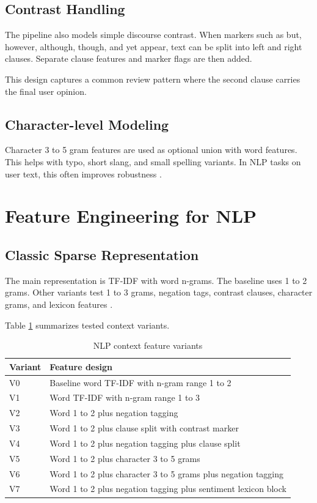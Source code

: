 \documentclass[12pt,a4paper]{article}
\begin{document}
\subsection{Contrast Handling}
The pipeline also models simple discourse contrast. When markers such as but, however, although, though, and yet appear, text can be split into left and right clauses. Separate clause features and marker flags are then added.

This design captures a common review pattern where the second clause carries the final user opinion.

\subsection{Character-level Modeling}
Character 3 to 5 gram features are used as optional union with word features. This helps with typo, short slang, and small spelling variants. In NLP tasks on user text, this often improves robustness \cite{joulin2017}.

\section{Feature Engineering for NLP}
\subsection{Classic Sparse Representation}
The main representation is TF-IDF with word n-grams. The baseline uses 1 to 2 grams. Other variants test 1 to 3 grams, negation tags, contrast clauses, character grams, and lexicon features \cite{manning2008ir,wang2012}.

Table \ref{tab:nlp_variant_design} summarizes tested context variants.

\begin{table}[H]
\centering
\caption{NLP context feature variants}
\label{tab:nlp_variant_design}
\begin{tabular}{>{\raggedright\arraybackslash}p{1.2cm} >{\raggedright\arraybackslash}p{12cm}}
\toprule
Variant & Feature design \\
\midrule
V0 & Baseline word TF-IDF with n-gram range 1 to 2 \\
V1 & Word TF-IDF with n-gram range 1 to 3 \\
V2 & Word 1 to 2 plus negation tagging \\
V3 & Word 1 to 2 plus clause split with contrast marker \\
V4 & Word 1 to 2 plus negation tagging plus clause split \\
V5 & Word 1 to 2 plus character 3 to 5 grams \\
V6 & Word 1 to 2 plus character 3 to 5 grams plus negation tagging \\
V7 & Word 1 to 2 plus negation tagging plus sentiment lexicon block \\
\bottomrule
\end{tabular}
\end{table}
\end{document}
